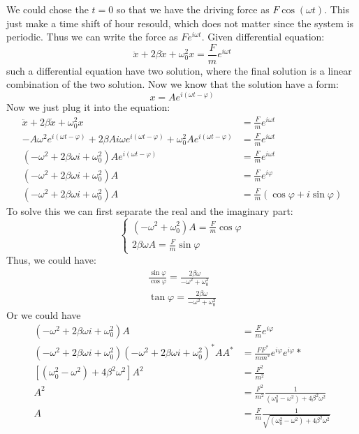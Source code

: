 \documentclass{article}
\begin{document}
\begin{enumerate}
\begin{enumerate}
        We could chose the $t= 0$ so that we have the driving force as $F \cos(\omega t)$. This just make a time shift of hour resould, which does not matter since the system is periodic. Thus we can write the force as $F e^{i\omega t}$.
        Given differential equation:
        \[
        \ddot{x} + 2\beta \dot{x} + \omega_0^2 x = \frac{F}{m} e^{i\omega t}
        \]
        such a differential equation have two solution, where the final solution is a linear combination of the two solution. Now we know that the solution have a form:
        \[
        x = Ae^{i(\omega t - \varphi)}
        \]
        Now we just plug it into the equation:
        \begin{align*}
            \ddot{x} + 2\beta \dot{x} + \omega_0^2 x &= \frac{F}{m} e^{i\omega t}\\
            -A \omega^2 e^{i(\omega t - \varphi)} + 2\beta A i \omega e^{i(\omega t - \varphi)} + \omega_0^2 A e^{i(\omega t - \varphi)} &= \frac{F}{m}e^{i\omega t}\\
            (-\omega^2+2\beta \omega i + \omega_0^2) A e^{i(\omega t - \varphi)} &= \frac{F}{m}e^{i\omega t} \\
            (-\omega^2+2\beta \omega i + \omega_0^2) A &= \frac{F}{m} e^{i \varphi} \\
            (-\omega^2+2\beta \omega i + \omega_0^2) A &= \frac{F}{m} (\cos\varphi + i \sin \varphi)
        \end{align*}
        To solve this we can first separate the real and the imaginary part:
        \[
        \left\{
        \begin{aligned}
        ( -\omega^2+\omega_0^2)A = \frac{F}{m} \cos\varphi \\
        2\beta \omega A = \frac{F}{m} \sin \varphi
        \end{aligned}
        \right. 
        \] 
        Thus, we could have:
        \begin{align*}
            \frac{\sin\varphi}{\cos\varphi} = \frac{2\beta \omega}{ -\omega^2+\omega_0^2} \\
            \tan \varphi= \frac{2\beta \omega}{ -\omega^2+\omega_0^2}
        \end{align*}
        Or we could have
        \begin{align*}
            (-\omega^2+2\beta \omega i + \omega_0^2) A &= \frac{F}{m} e^{i \varphi}\\
            (-\omega^2+2\beta \omega i + \omega_0^2)(-\omega^2+2\beta \omega i + \omega_0^2)^* A A^* &= \frac{FF^*}{mm^*} e^{i \varphi}e^{i \varphi}* \\
            [(\omega_0^2-\omega^2)+4\beta^2 \omega^2]A^2 &= \frac{F^2}{m^2}\\
            A^2 &= \frac{F^2}{m^2}\frac{1}{(\omega_0^2-\omega^2)+4\beta^2 \omega^2} \\
            A &= \frac{F}{m}\frac{1}{\sqrt{(\omega_0^2-\omega^2)+4\beta^2 \omega^2}}
        \end{align*}



\end{enumerate}
\end{enumerate}
\end{document}
